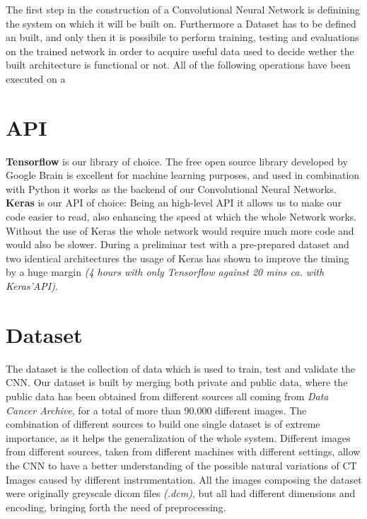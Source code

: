 \documentclass[../main.tex]{subfiles}
\begin{document}
\label{capitolo5}
\thispagestyle{empty}

The first step in the construction of a Convolutional Neural Network is definining the system on which it will be built on. Furthermore a Dataset has to be defined an built, and only then it is possibile to perform training, testing and evaluations on the trained network in order to acquire useful data used to decide wether the built architecture is functional or not. All of the following operations have been executed on a %

\section{API}
\textbf{Tensorflow} is our library of choice. The free open source library developed by Google Brain is excellent for machine learning purposes\cite{Tensorflow2017}, and used in combination with Python it works as the backend of our Convolutional Neural Networks. \textbf{Keras} is our API of choice: Being an high-level API it allows us to make our code easier to read, also enhancing the speed at which the whole Network works. Without the use of Keras the whole network would require much more code and would also be slower. During a preliminar test with a pre-prepared dataset and two identical architectures the usage of Keras has shown to improve the timing by a huge margin \textit{(4 hours with only Tensorflow against 20 mins ca. with Keras'API)}. 

\section{Dataset}
The dataset is the collection of data which is used to train, test and validate the CNN. Our dataset is built by merging both private and public data, where the public data has been obtained from different sources all coming from \textit{Data Cancer Archive}, for a total of more than 90.000 different images.
The combination of different sources to build one single dataset is of extreme importance, as it helps the generalization of the whole system. Different images from different sources, taken from different machines with different settings, allow the CNN to have a better understanding of the possible natural variations of CT Images caused by different instrumentation.
All the images composing the dataset were originally greyscale dicom files \textit{(.dcm)}, but all had different dimensions and encoding, bringing forth the need of preprocessing.
\vspace{5mm}
\end{document}
